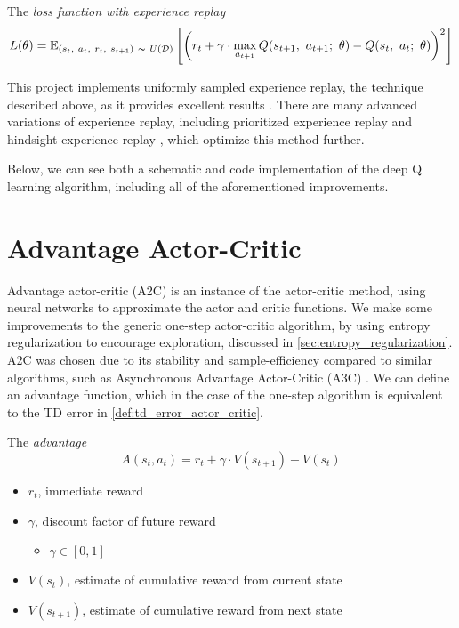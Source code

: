 \begin{definition}
  The \textit{loss function with experience replay}
  $$L(\theta)=\mathbb{E}_{(s_t,~a_t,~r_t,~s_{t+1})~\thicksim ~U(\mathcal{D})}\left[\left(r_t+\gamma\cdot\max_{a_{t+1}}Q(s_{t+1},~a_{t+1};~\theta)-Q(s_{t},~a_{t};~\theta)\right)^{2}\right]$$
\end{definition}

This project implements uniformly sampled experience replay, the technique
described above, as it provides excellent results \cite{mnih2013playing}. There
are many advanced variations of experience replay, including prioritized
experience replay \cite{schaul2015prioritized} and hindsight experience replay
\cite{andrychowicz2017hindsight}, which optimize this method further.

Below, we can see both a schematic and code implementation of the deep Q
learning algorithm, including all of the aforementioned improvements.





\newpage

\section{Advantage Actor-Critic}

Advantage actor-critic (A2C) is an instance of the actor-critic method, using
neural networks to approximate the actor and critic functions. We make some
improvements to the generic one-step actor-critic algorithm, by using entropy
regularization to encourage exploration, discussed in
\autoref{sec:entropy_regularization}. A2C was chosen due to its stability and
sample-efficiency compared to similar algorithms, such as Asynchronous
Advantage Actor-Critic (A3C) \cite{wu2017scalable}. We can define an advantage
function, which in the case of the one-step algorithm is equivalent to the TD
error in \autoref{def:td_error_actor_critic}.

\begin{definition} \label{def:td_error_a2c}
  The \textit{advantage}
  $$A(s_t, a_t) = r_t+\gamma\cdot V(s_{t+1}) - V(s_t)$$
  \begin{itemize}[label={}]
    \item $r_t$, immediate reward
    \item $\gamma$, discount factor of future reward
          \begin{itemize}[label={}]
            \item $\gamma\in[0,1]$
          \end{itemize}
    \item $V(s_t)$, estimate of cumulative reward from current state
    \item $V(s_{t+1})$, estimate of cumulative reward from next state
  \end{itemize}
\end{definition}

